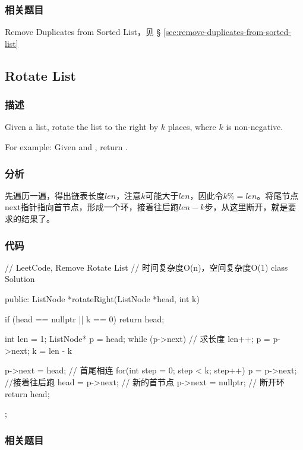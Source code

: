 \subsubsection{相关题目}

\begindot
\item Remove Duplicates from Sorted List，见 \S 
\ref{sec:remove-duplicates-from-sorted-list}
\myenddot


\subsection{Rotate List}
\label{sec:rotate-list}


\subsubsection{描述}
Given a list, rotate the list to the right by $k$ places, where $k$ is 
non-negative.

For example:
Given  and , return 
.


\subsubsection{分析}
先遍历一遍，得出链表长度$len$，注意$k$可能大于$len$，因此令$k \%= 
len$。将尾节点next指针指向首节点，形成一个环，接着往后跑$len-k$步，从这里断开，就是要求的结果了。


\subsubsection{代码}
\begin{Code}
	// LeetCode, Remove Rotate List
	// 时间复杂度O(n)，空间复杂度O(1)
	class Solution {
		public:
		ListNode *rotateRight(ListNode *head, int k) {
			if (head == nullptr || k == 0) return head;
			
			int len = 1;
			ListNode* p = head;
			while (p->next) { // 求长度
				len++;
				p = p->next;
			}
			k = len - k %
			
			p->next = head; // 首尾相连
			for(int step = 0; step < k; step++) {
				p = p->next;  //接着往后跑
			}
			head = p->next; // 新的首节点
			p->next = nullptr; // 断开环
			return head;
		}
	};
\end{Code}


\subsubsection{相关题目}

